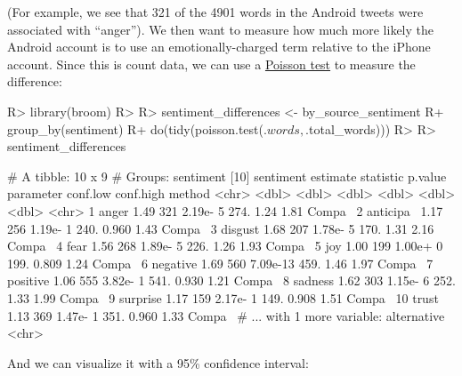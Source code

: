 \documentclass[
]{jss}
\begin{document}
(For example, we see that 321 of the 4901 words in the Android tweets
were associated with ``anger''). We then want to measure how much more
likely the Android account is to use an emotionally-charged term
relative to the iPhone account. Since this is count data, we can use a
\href{https://stat.ethz.ch/R-manual/R-devel/library/stats/html/poisson.test.html}{Poisson
test} to measure the difference:

\begin{CodeChunk}

\begin{CodeInput}
R> library(broom)
R> 
R> sentiment_differences <- by_source_sentiment %
R+   group_by(sentiment) %
R+   do(tidy(poisson.test(.$words, .$total_words)))
R> 
R> sentiment_differences
\end{CodeInput}

\begin{CodeOutput}
# A tibble: 10 x 9
# Groups:   sentiment [10]
   sentiment estimate statistic  p.value parameter conf.low conf.high method
   <chr>        <dbl>     <dbl>    <dbl>     <dbl>    <dbl>     <dbl> <chr> 
 1 anger         1.49       321 2.19e- 5      274.    1.24       1.81 Compa~
 2 anticipa~     1.17       256 1.19e- 1      240.    0.960      1.43 Compa~
 3 disgust       1.68       207 1.78e- 5      170.    1.31       2.16 Compa~
 4 fear          1.56       268 1.89e- 5      226.    1.26       1.93 Compa~
 5 joy           1.00       199 1.00e+ 0      199.    0.809      1.24 Compa~
 6 negative      1.69       560 7.09e-13      459.    1.46       1.97 Compa~
 7 positive      1.06       555 3.82e- 1      541.    0.930      1.21 Compa~
 8 sadness       1.62       303 1.15e- 6      252.    1.33       1.99 Compa~
 9 surprise      1.17       159 2.17e- 1      149.    0.908      1.51 Compa~
10 trust         1.13       369 1.47e- 1      351.    0.960      1.33 Compa~
# ... with 1 more variable: alternative <chr>
\end{CodeOutput}
\end{CodeChunk}

And we can visualize it with a 95\% confidence interval:
\end{document}
